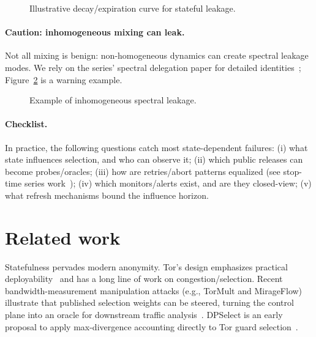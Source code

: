 \documentclass[11pt]{article}
\begin{document}
\begin{figure}[t]
  \centering
  \caption{Illustrative decay/expiration curve for stateful leakage.}
  \label{fig:forgetting}
\end{figure}

\paragraph{Caution: inhomogeneous mixing can leak.}
Not all mixing is benign: non-homogeneous dynamics can create spectral leakage modes.
We rely on the series' spectral delegation paper for detailed identities~\cite{series:spectral};
Figure~\ref{fig:inhom} is a warning example.

\begin{figure}[t]
  \centering
  \caption{Example of inhomogeneous spectral leakage.}
  \label{fig:inhom}
\end{figure}

\paragraph{Checklist.}
In practice, the following questions catch most state-dependent failures:
(i) what state influences selection, and who can observe it;
(ii) which public releases can become probes/oracles;
(iii) how are retries/abort patterns equalized (see stop-time series work~\cite{series:stoptimeaddendum});
(iv) which monitors/alerts exist, and are they closed-view;
(v) what refresh mechanisms bound the influence horizon.


\section{Related work}
Statefulness pervades modern anonymity.
Tor's design emphasizes practical deployability~\cite{dingledine2004tor} and has a long line of work on congestion/selection.
Recent bandwidth-measurement manipulation attacks (e.g., TorMult and MirageFlow) illustrate that published selection weights can be steered, turning the control plane into an oracle for downstream traffic analysis~\cite{Sendner2023TorMult,Sendner2024MirageFlow}.
DPSelect is an early proposal to apply max-divergence accounting directly to Tor guard selection~\cite{Hanley2019DPSelect}.
\end{document}
